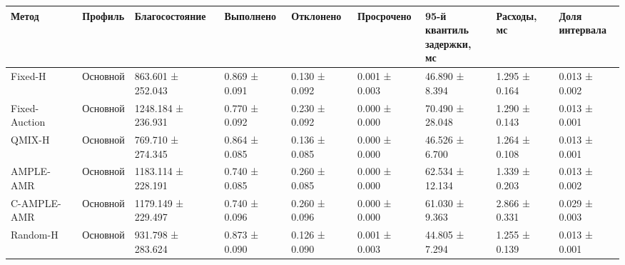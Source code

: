 \begin{tabular}{lllllllll}
\toprule
 Метод & Профиль & Благосостояние & Выполнено & Отклонено & Просрочено & \shortstack{95-й квантиль\\задержки, мс} & Расходы, мс & \shortstack{Доля\\интервала} \\
\midrule
 Fixed-H & Основной & 863.601 ± 252.043 & 0.869 ± 0.091 & 0.130 ± 0.092 & 0.001 ± 0.003 & 46.890 ± 8.394 & 1.295 ± 0.164 & 0.013 ± 0.002 \\
 Fixed-Auction & Основной & 1248.184 ± 236.931 & 0.770 ± 0.092 & 0.230 ± 0.092 & 0.000 ± 0.000 & 70.490 ± 28.048 & 1.290 ± 0.143 & 0.013 ± 0.001 \\
 QMIX-H & Основной & 769.710 ± 274.345 & 0.864 ± 0.085 & 0.136 ± 0.085 & 0.000 ± 0.000 & 46.526 ± 6.700 & 1.264 ± 0.108 & 0.013 ± 0.001 \\
 AMPLE-AMR & Основной & 1183.114 ± 228.191 & 0.740 ± 0.085 & 0.260 ± 0.085 & 0.000 ± 0.000 & 62.534 ± 12.134 & 1.339 ± 0.203 & 0.013 ± 0.002 \\
 C-AMPLE-AMR & Основной & 1179.149 ± 229.497 & 0.740 ± 0.096 & 0.260 ± 0.096 & 0.000 ± 0.000 & 61.030 ± 9.363 & 2.866 ± 0.331 & 0.029 ± 0.003 \\
 Random-H & Основной & 931.798 ± 283.624 & 0.873 ± 0.090 & 0.126 ± 0.090 & 0.001 ± 0.003 & 44.805 ± 7.294 & 1.255 ± 0.139 & 0.013 ± 0.001 \\
\bottomrule
\end{tabular}
